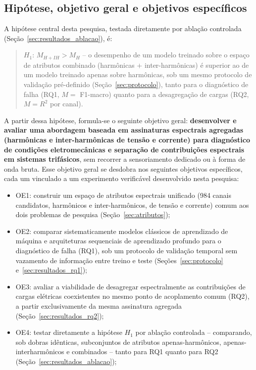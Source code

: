\documentclass[times,final]{elsarticle}
\begin{document}
{\subsection{Hipótese, objetivo geral e objetivos específicos}
\label{sec:hipotese}
A hipótese central desta pesquisa, testada diretamente por ablação controlada (Seção~\ref{sec:resultados_ablacao}), é:
\begin{quote}
$H_1$: $M_{H+IH} > M_H$ -- o desempenho de um modelo treinado sobre o espaço de atributos combinado (harmônicas $+$ inter-harmônicas) é superior ao de um modelo treinado apenas sobre harmônicas, sob um mesmo protocolo de validação pré-definido (Seção~\ref{sec:protocolo}), tanto para o diagnóstico de falha (RQ1, $M=$ F1-macro) quanto para a desagregação de cargas (RQ2, $M=R^2$ por canal).
\end{quote}
A partir dessa hipótese, formula-se o seguinte objetivo geral: \textbf{desenvolver e avaliar uma abordagem baseada em assinaturas espectrais agregadas (harmônicas e inter-harmônicas de tensão e corrente) para diagnóstico de condições eletromecânicas e separação de contribuições espectrais em sistemas trifásicos}, sem recorrer a sensoriamento dedicado ou à forma de onda bruta. Esse objetivo geral se desdobra nos seguintes objetivos específicos, cada um vinculado a um experimento verificável desenvolvido nesta pesquisa:
\begin{itemize}
    \item OE1: construir um espaço de atributos espectrais unificado (984 canais candidatos, harmônicos e inter-harmônicos, de tensão e corrente) comum aos dois problemas de pesquisa (Seção~\ref{sec:atributos});
    \item OE2: comparar sistematicamente modelos clássicos de aprendizado de máquina e arquiteturas sequenciais de aprendizado profundo para o diagnóstico de falha (RQ1), sob um protocolo de validação temporal sem vazamento de informação entre treino e teste (Seções~\ref{sec:protocolo} e~\ref{sec:resultados_rq1});
    \item OE3: avaliar a viabilidade de desagregar espectralmente as contribuições de cargas elétricas coexistentes no mesmo ponto de acoplamento comum (RQ2), a partir exclusivamente da mesma assinatura agregada (Seção~\ref{sec:resultados_rq2});
    \item OE4: testar diretamente a hipótese $H_1$ por ablação controlada -- comparando, sob dobras idênticas, subconjuntos de atributos apenas-harmônicos, apenas-interharmônicos e combinados -- tanto para RQ1 quanto para RQ2 (Seção~\ref{sec:resultados_ablacao});

\end{itemize}}
\end{document}
